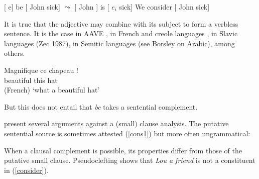 \documentclass[output=paper
                ,modfonts
                ,nonflat
	        ,collection
	        ,collectionchapter
	        ,collectiontoclongg
 	        ,biblatex
                ,babelshorthands
                ,newtxmath
                ,draftmode
                ,colorlinks, citecolor=brown
]{./langsci/langscibook}
\begin{document}
\begin{exe}
\ex  {}[ e] be [ John sick] $\leadsto$  [ John ] is  [ $e_{i}$ sick] \label{rais1}
\ex   We consider [ John sick] \label{ecm}
\end{exe}

It is true that the adjective may combine with its subject to form a verbless sentence. It is the
case in AAVE \citep{Bender2001a}, in French \citet{Laurens2008} and creole languages
\citet{HenriandAbeille2007}, in Slavic languages (Zec 1987), in Semitic languages (see
Borsley on Arabic), among others. 

\begin{exe}
\ex \gll Magnifique ce chapeau !\\
beautiful this hat\\\hfill{(French)}
\glt `what a beautiful hat'
\end{exe}

But this does not entail that \emph{be} takes a sentential complement. 




\citet[Chapter~3]{PollardandSag1994} present several arguments against a (small) clause analysis. The putative sentential source is sometimes attested (\ref{cons1}) but more often ungrammatical:

	
\eal
{}
\zl

	
When a clausal complement is possible, its properties differ from those of the putative small clause. Pseudoclefting shows that \textit{Lou a friend} is not a constituent in (\ref{consider}).

\eal
{}
\zl
\end{document}
